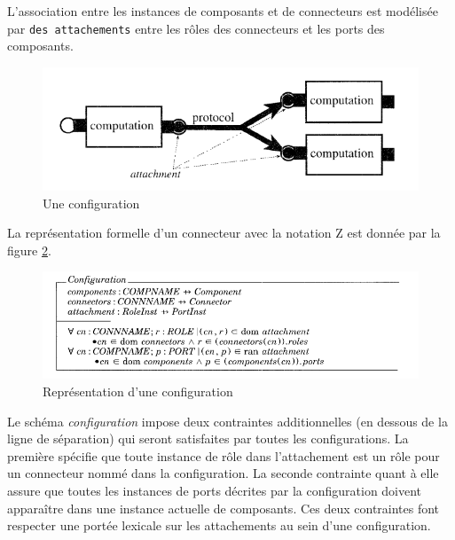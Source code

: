 L'association entre les instances de composants et de connecteurs est modélisée par \texttt{des attachements} entre les rôles des connecteurs et les ports des composants.
\begin{figure}[h!]
\includegraphics[scale=0.7]{images/configuration_Z.png}
  \caption{Une configuration}
  \label{fig:Z_configuration}
\end{figure}
La représentation formelle d'un connecteur avec la notation Z est donnée par la figure \ref{fig:Z_configuration_schema}.
\begin{figure}[h!]
  \includegraphics[scale=0.7]{images/Z_configuration_schema.png}
  \caption{Représentation d'une configuration}
  \label{fig:Z_configuration_schema}
\end{figure}

Le schéma \textsl{configuration} impose deux contraintes additionnelles (en dessous de la ligne de séparation) qui seront satisfaites par toutes les configurations. La première spécifie que toute instance de rôle dans l'attachement est un rôle pour un connecteur nommé dans la configuration. La seconde contrainte quant à elle assure que toutes les instances de ports décrites par la configuration doivent apparaître dans une instance actuelle de composants. Ces deux contraintes font respecter une portée lexicale sur les attachements au sein d'une configuration.
